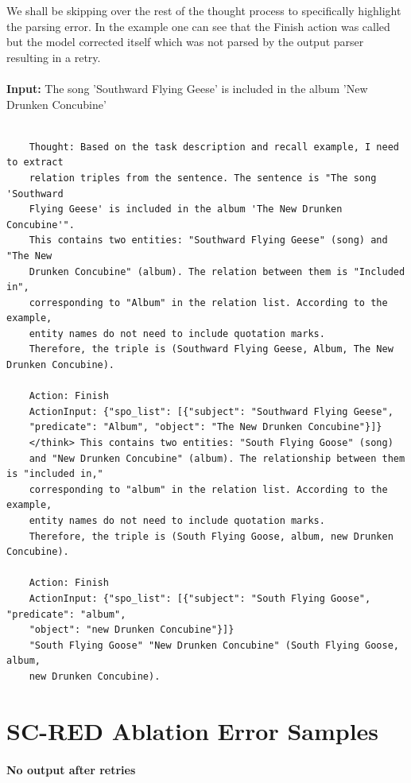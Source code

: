 We shall be skipping over the rest of the thought process to specifically highlight the parsing error. In the example one can see that the Finish action was called but the model corrected itself which was not parsed by the output parser resulting in a retry.  \\
~\\
\textbf{Input:} The song 'Southward Flying Geese' is included in the album 'New Drunken Concubine'\\
~\\
\begin{verbatim}
    Thought: Based on the task description and recall example, I need to extract 
    relation triples from the sentence. The sentence is "The song 'Southward 
    Flying Geese' is included in the album 'The New Drunken Concubine'". 
    This contains two entities: "Southward Flying Geese" (song) and "The New 
    Drunken Concubine" (album). The relation between them is "Included in", 
    corresponding to "Album" in the relation list. According to the example, 
    entity names do not need to include quotation marks. 
    Therefore, the triple is (Southward Flying Geese, Album, The New Drunken Concubine).

    Action: Finish
    ActionInput: {"spo_list": [{"subject": "Southward Flying Geese", 
    "predicate": "Album", "object": "The New Drunken Concubine"}]}
    </think> This contains two entities: "South Flying Goose" (song) 
    and "New Drunken Concubine" (album). The relationship between them is "included in," 
    corresponding to "album" in the relation list. According to the example, 
    entity names do not need to include quotation marks. 
    Therefore, the triple is (South Flying Goose, album, new Drunken Concubine).
    
    Action: Finish
    ActionInput: {"spo_list": [{"subject": "South Flying Goose", "predicate": "album", 
    "object": "new Drunken Concubine"}]}
    "South Flying Goose" "New Drunken Concubine" (South Flying Goose, album, 
    new Drunken Concubine).
\end{verbatim}

\section{SC-RED Ablation Error Samples}
\label{app:scred_error_samples}

\paragraph{No output after retries}

